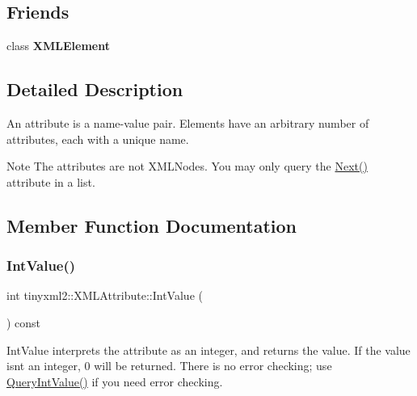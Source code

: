 \subsection*{Friends}
\begin{DoxyCompactItemize}
\item 
\mbox{\label{classtinyxml2_1_1_x_m_l_attribute_ac2fba9b6e452829dd892f7392c24e0eb}} 
class {\bfseries X\+M\+L\+Element}
\end{DoxyCompactItemize}


\subsection{Detailed Description}
An attribute is a name-\/value pair. Elements have an arbitrary number of attributes, each with a unique name.

\begin{DoxyNote}{Note}
The attributes are not X\+M\+L\+Nodes. You may only query the \hyperlink{classtinyxml2_1_1_x_m_l_attribute_aee53571b21e7ce5421eb929523a8bbe6}{Next()} attribute in a list. 
\end{DoxyNote}


\subsection{Member Function Documentation}
\mbox{\label{classtinyxml2_1_1_x_m_l_attribute_adfa2433f0fdafd5c3880936de9affa80}} 
\subsubsection{\texorpdfstring{Int\+Value()}{IntValue()}}
{\footnotesize\ttfamily int tinyxml2\+::\+X\+M\+L\+Attribute\+::\+Int\+Value (\begin{DoxyParamCaption}{ }\end{DoxyParamCaption}) const\hspace{0.3cm}{\ttfamily [inline]}}

Int\+Value interprets the attribute as an integer, and returns the value. If the value isn\textquotesingle{}t an integer, 0 will be returned. There is no error checking; use \hyperlink{classtinyxml2_1_1_x_m_l_attribute_a6d5176260db00ea301c01af8457cd993}{Query\+Int\+Value()} if you need error checking. \mbox{\label{classtinyxml2_1_1_x_m_l_attribute_a6d5176260db00ea301c01af8457cd993}} 
